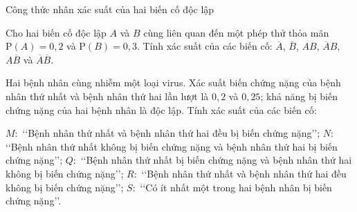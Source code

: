 
\begin{dang}{Công thức nhân xác suất của hai biến cố độc lập}
\end{dang}


\begin{vd}%
	Cho hai biến cố độc lập $A$ và $B$ cùng liên quan đến một phép thử thỏa mãn $\mathrm{P}(A)=0{,}2$ và $\mathrm{P}(B)=0{,}3$. Tính xác suất của các biến cố: $\overline{A}$, $\overline{B}$, $AB$, $\overline{A} B$, $A \overline{B}$ và $\overline{A}\overline{B}$.
\end{vd}



\begin{vd}%
	Hai bệnh nhân cùng nhiễm một loại virus. Xác suất biến chứng nặng của bệnh nhân thứ nhất và bệnh nhân thứ hai lần lượt là $0{,}2$ và $0{,}25$; khả năng bị biến chứng nặng của hai bệnh nhân là độc lập. Tính xác suất của các biến cố:
	\begin{tasks}
		\task $M\colon$ \lq\lq Bệnh nhân thứ nhất và bệnh nhân thứ hai đều bị biến chứng nặng\rq\rq;
		\task $N\colon$ \lq\lq Bệnh nhân thứ nhất không bị biến chứng nặng và bệnh nhân thứ hai bị biến chứng nặng\rq\rq;
		\task $Q\colon$ \lq\lq Bệnh nhân thứ nhất bị biến chứng nặng và bệnh nhân thứ hai không bị biến chứng nặng\rq\rq;
		\task $R\colon$ \lq\lq Bệnh nhân thứ nhất và bệnh nhân thứ hai đều không bị biến chứng nặng\rq\rq;
		\task $S\colon$ \lq\lq Có ít nhất một trong hai bệnh nhân bị biến chứng nặng\rq\rq.
	\end{tasks}
\end{vd}


